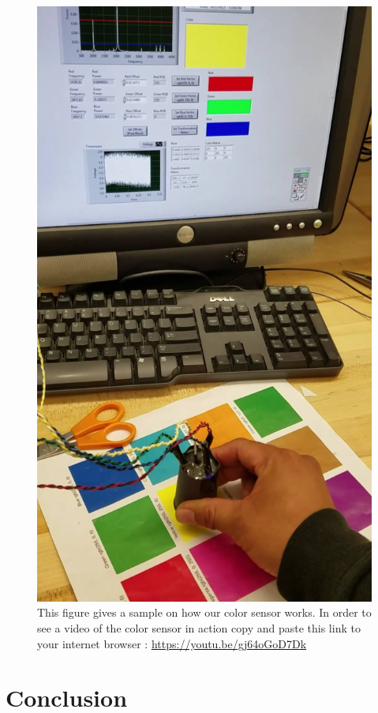 \documentclass[paper=letter, fontsize=12pt]{article}
\begin{document}
\begin{figure}[H]
\centering
\includegraphics[scale=.2]{testing_sensor.png}
\caption{This figure gives a sample on how our color sensor works. In order to see a video of the color sensor in action copy and paste this link to your internet browser : \url{ https://youtu.be/gj64oGoD7Dk} }
\label{testing_sensor}
\end{figure}



\section*{Conclusion}
\end{document}
